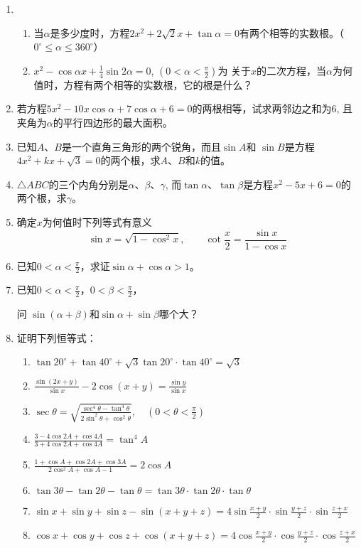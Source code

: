 \begin{enumerate}
\item \begin{enumerate}
    \item 当$\alpha$是多少度时，方程$2x^2+2\sqrt{2}x+\tan \alpha=0$有两个相等的实数根。（$0^{\circ}\le \alpha\le 360^{\circ}$）
    \item $x^2-\cos\alpha x+\frac{1}{4}\sin2\alpha=0$, $\left(0<\alpha<\frac{\pi}{2}\right)$为
关于$x$的二次方程，当$\alpha$为何值时，方程有两个相等的实数根，它的根是什么？
\end{enumerate}
\item 若方程$5x^2-10x\cos \alpha+7\cos\alpha+6=0$的两根相等，试求两邻边之和为6, 且夹角为$\alpha$的平行四边形的最大面积。
\item 已知$A$、$B$是一个直角三角形的两个锐角，而且$\sin A$和
$\sin B$是方程$4x^2+kx+\sqrt{3}=0$的两个根，求$A$、$B$和$k$的值。
\item $\triangle ABC$的三个内角分别是$\alpha$、$\beta$、$\gamma$, 而$\tan \alpha$、$\tan \beta$是方程$x^2-5x+6=0$的两个根，求$\gamma$。
\item 确定$x$为何值时下列等式有意义
\[\sin x=\sqrt{1-\cos^2x},\qquad \cot\frac{x}{2}=\frac{\sin x}{1-\cos x}\]
\item 已知$0<\alpha<\frac{\pi}{2}$，求证$\sin\alpha+\cos\alpha>1$。
\item 已知$0<\alpha<\frac{\pi}{2}$，$0<\beta<\frac{\pi}{2}$，

问 $\sin(\alpha+\beta)$和$\sin\alpha+\sin\beta$哪个大？
\item 证明下列恒等式：
\begin{enumerate}
    \item $\tan 20^{\circ}+\tan 40^{\circ}+\sqrt{3}\tan 20^{\circ}\cdot \tan 40^{\circ}=\sqrt{3}$
    \item $\frac{\sin (2 x+y)}{\sin x}-2 \cos (x+y)=\frac{\sin y}{\sin x}$
    \item $\sec \theta=\sqrt{\frac{\sec ^{4} \theta-\tan ^{4}\theta}{2 \sin ^{2} \theta+\cos ^{2} \theta}}, \quad\left(0<\theta<\frac{\pi}{2}\right)$
    \item $\frac{3-4 \cos 2 A+\cos 4 A}{3+4 \cos 2 A+\cos 4 A}=\tan ^{4} A$
    \item $\frac{1+\cos A+\cos 2 A+\cos 3 A}{2 \cos ^{2} A+\cos A-1}=2 \cos A$
    \item $\tan  3 \theta-\tan  2 \theta-\tan  \theta=\tan  3 \theta \cdot \tan  2 \theta \cdot \tan  \theta$
    \item $\sin x+\sin y+\sin z-\sin (x+y+z)=4 \sin \frac{x+y}{2} \cdot \sin \frac{y+z}{2} \cdot \sin \frac{z+x}{2}$
    \item $\cos x+\cos y+\cos z+\cos (x+y+z)=4 \cos \frac{x+y}{2} \cdot \cos \frac{y+z}{2} \cdot \cos \frac{z+x}{2}$
\end{enumerate}



\end{enumerate}
